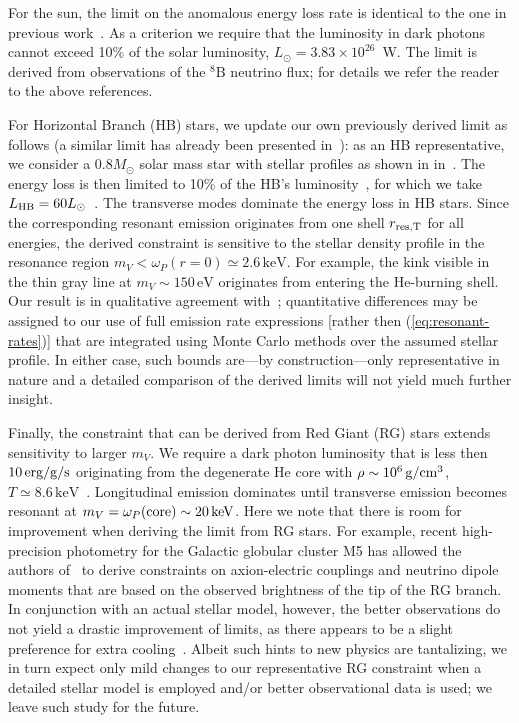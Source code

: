 \documentclass[prd,reprint,nofootinbib,notitlepage,aps,tightenlines,preprintnumbers,amsmath,amssymb,showpacs,superscriptaddress]{revtex4-1}
\renewcommand{\sec}{\ensuremath{\mathrm{s}}}
\newcommand{\cm}{\ensuremath{\mathrm{cm}}}
\newcommand{\eV}{\ensuremath{\mathrm{eV}}}
\newcommand{\keV}{\ensuremath{\mathrm{keV}}}
\begin{document}
For the sun, the limit on the anomalous energy loss rate is identical
to the one in previous work~\cite{An:2013yfc, Redondo:2013lna}. As a criterion
we require that the luminosity in dark photons cannot exceed 10\% of
the solar luminosity, $L_{\odot} = 3.83\times 10^{26}$~W. The limit is
derived from observations of the $^8$B neutrino flux; for details we
refer the reader to the above references.


For Horizontal Branch (HB) stars, we update our own previously derived
limit as follows (a similar limit has already been presented
in~\cite{Redondo:2013lna}): as an HB representative, we consider a
$0.8 M_{\odot} $ solar mass star with stellar profiles as shown in
in~\cite{Raffelt:1996wa,Dearborn:1989he}. The energy loss is then
limited to 10\% of the HB's luminosity~\cite{Raffelt:1996wa}, for
which we take $L_{\rm HB} = 60 L_{\odot}$~\cite{Dearborn:1989he}.  The
transverse modes dominate the energy loss in HB stars. Since the
corresponding resonant emission originates from one shell
$r_{\rm res, T}$ for all energies, the derived constraint is sensitive
to the stellar density profile in the resonance region
$m_V < \omega_P(r=0)\simeq 2.6\,\keV$. For example, the kink visible
in the thin gray line at $m_V\sim 150\,\eV$ originates from entering
the He-burning shell.  Our result is in qualitative agreement
with~\cite{Redondo:2013lna}; quantitative differences may be assigned
to our use of full emission rate expressions [rather then
(\ref{eq:resonant-rates})] that are integrated using Monte Carlo
methods over the assumed stellar profile. In either case, such bounds
are---by construction---only representative in nature and a detailed
comparison of the derived limits will not yield much further insight.


Finally, the constraint that can be derived from Red Giant (RG) stars
extends sensitivity to larger $m_V$. We require a dark photon
luminosity that is less then $10\,{\rm erg}/{\rm g}/\sec$ originating
from the degenerate He core with $\rho \sim 10^6\,{\rm g}/\cm^3 $,
$T\simeq 8.6\,\keV$~\cite{Raffelt:1996wa}. Longitudinal emission
dominates until transverse emission becomes resonant at
$m_V = \omega_P({\rm core}) \sim 20\,\keV$.  Here we note that there
is room for improvement when deriving the limit from RG stars. For
example, recent high-precision photometry for the Galactic globular
cluster M5 has allowed the authors of~\cite{2013PhRvL.111w1301V} to
derive constraints on axion-electric couplings and neutrino dipole
moments that are based on the observed brightness of the tip of the RG
branch. In conjunction with an actual stellar model, however, the
better observations do not yield a drastic improvement of limits, as
there appears to be a slight preference for extra
cooling~\cite{2013PhRvL.111w1301V}. Albeit such hints to new physics
are tantalizing, we in turn expect only mild changes to our
representative RG constraint when a detailed stellar model is employed
and/or better observational data is used; we leave such study for the
future.
\end{document}
